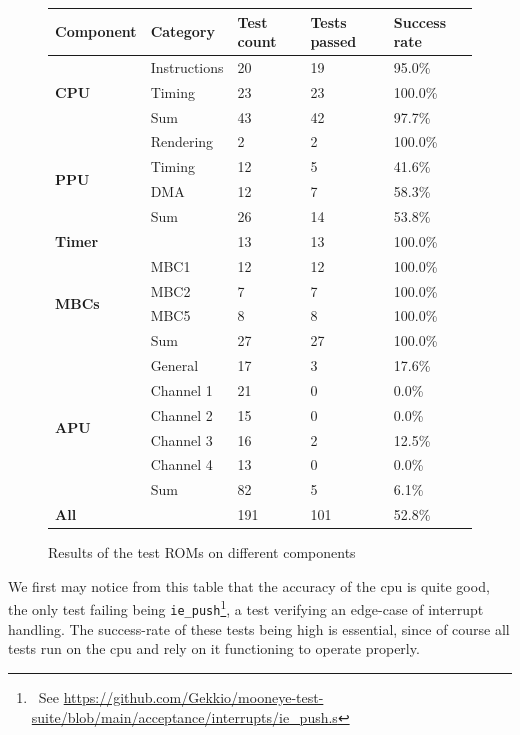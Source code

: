\documentclass[11pt]{informatics-report}
\newcommand{\ftnt}[1]{\footnote{~See \url{#1}}}
\begin{document}
\begin{figure}[h]
    \centering
    \begin{tabular}{|l|l|l|l|l|}
    \hline
    \textbf{Component} & \textbf{Category} & \textbf{Test count} & \textbf{Tests passed} & \textbf{Success rate} \\ \hline
	\multirow{3}{*}{\textbf{CPU}}
    & Instructions & 20 & 19 &  95.0\% \\
    &       Timing & 23 & 23 & 100.0\% \\\cline{2-5}
    &          Sum & 43 & 42 &  97.7\% \\\hline
	\multirow{4}{*}{\textbf{PPU}}
    &    Rendering &  2 &  2 & 100.0\% \\
    &       Timing & 12 &  5 &  41.6\% \\
    &          DMA & 12 &  7 &  58.3\% \\\cline{2-5}
    &          Sum & 26 & 14 &  53.8\% \\\hline
    \multicolumn{2}{|l|}{\textbf{Timer}} & 13 & 13 & 100.0\% \\\hline
   	\multirow{4}{*}{\textbf{MBCs}}
    &         MBC1 & 12 & 12 & 100.0\% \\
    &         MBC2 &  7 &  7 & 100.0\% \\
    &         MBC5 &  8 &  8 & 100.0\% \\\cline{2-5}
    &          Sum & 27 & 27 & 100.0\% \\\hline
   	\multirow{6}{*}{\textbf{APU}}
    &      General & 17 &  3 &  17.6\% \\
    &    Channel 1 & 21 &  0 &   0.0\% \\
    &    Channel 2 & 15 &  0 &   0.0\% \\
    &    Channel 3 & 16 &  2 &  12.5\% \\
    &    Channel 4 & 13 &  0 &   0.0\% \\\cline{2-5}
    &          Sum & 82 &  5 &   6.1\% \\\hline
    \multicolumn{2}{|l|}{\textbf{All}} & 191 & 101 & 52.8\% \\\hline
    \end{tabular}
    \caption{Results of the test ROMs on different components}
    \label{fig:stats-tests-absolute}
\end{figure}

We first may notice from this table that the accuracy of the \gls{cpu} is quite good, the only test failing being \texttt{ie\_push}\ftnt{https://github.com/Gekkio/mooneye-test-suite/blob/main/acceptance/interrupts/ie\_push.s}, a test verifying an edge-case of interrupt handling. The success-rate of these tests being high is essential, since of course all tests run on the \gls{cpu} and rely on it functioning to operate properly.
\end{document}
